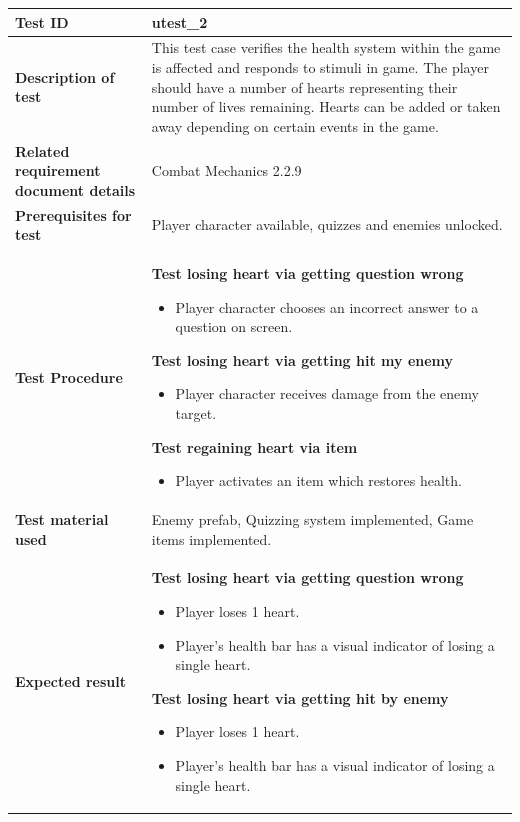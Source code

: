 \documentclass[11pt, a4paper]{article}
\begin{document}
\begin{center}
\begin{tabularx}{\linewidth}{|>{\raggedright\arraybackslash}m{4cm}|X|}
    \hline
    \textbf{Test ID} & utest\_2 \\
    \hline
    \textbf{Description of test} & This test case verifies the health system within the game is affected and responds to stimuli in game. The player should have a number of hearts representing their number of lives remaining. Hearts can be added or taken away depending on certain events in the game. \\
    \hline
    \textbf{Related requirement document details} & Combat Mechanics 2.2.9 \\
    \hline
    \textbf{Prerequisites for test} & Player character available, quizzes and enemies unlocked. \\
    \hline
    \textbf{Test Procedure} &
    \textbf{Test losing heart via getting question wrong}
    \begin{itemize}
        \item Player character chooses an incorrect answer to a question on screen.
    \end{itemize}
    \textbf{Test losing heart via getting hit my enemy}
    \begin{itemize}
        \item Player character receives damage from the enemy target.
    \end{itemize}
    \textbf{Test regaining heart via item}
    \begin{itemize}
        \item Player activates an item which restores health.
    \end{itemize}
    \\
    \hline
    \textbf{Test material used} & Enemy prefab, Quizzing system implemented, Game items implemented. \\
    \hline
    \textbf{Expected result} &
    \textbf{Test losing heart via getting question wrong}
    \begin{itemize}
        \item Player loses 1 heart.
        \item Player’s health bar has a visual indicator of losing a single heart.
    \end{itemize}
    \textbf{Test losing heart via getting hit by enemy}
    \begin{itemize}
        \item Player loses 1 heart.
        \item Player’s health bar has a visual indicator of losing a single heart.

\end{itemize}
\end{tabularx}
\end{center}
\end{document}
